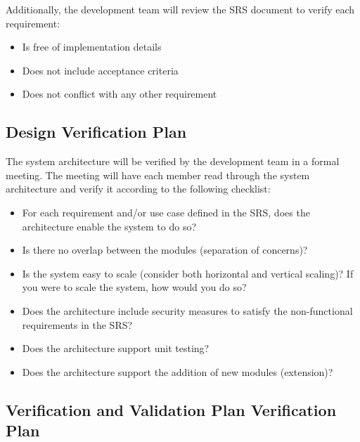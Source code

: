\documentclass[12pt, titlepage]{article}
\begin{document}
Additionally, the development team will review the SRS document to verify each requirement:
\begin{itemize}
\item Is free of implementation details
\item Does not include acceptance criteria
\item Does not conflict with any other requirement
\end{itemize}


\subsection{Design Verification Plan}




The system architecture will be verified by the development team in a formal meeting. The meeting will have each member read through the system architecture and verify it according to the following checklist:
\begin{itemize}
\item For each requirement and/or use case defined in the SRS, does the architecture enable the system to do so?
\item Is there no overlap between the modules (separation of concerns)?
\item Is the system easy to scale (consider both horizontal and vertical scaling)? If you were to scale the system, how would you do so?
\item Does the architecture include security measures to satisfy the non-functional requirements in the SRS?
\item Does the architecture support unit testing?
\item Does the architecture support the addition of new modules (extension)? 
\end{itemize}

\subsection{Verification and Validation Plan Verification Plan}


\end{document}
